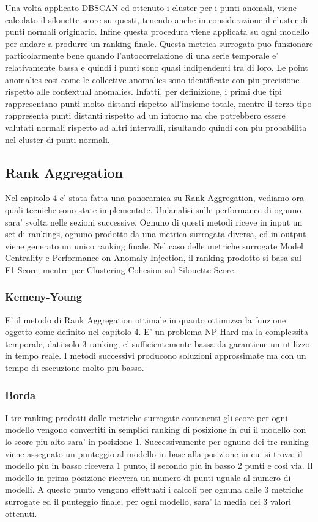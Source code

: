 Una volta applicato DBSCAN ed ottenuto i cluster per i punti anomali, viene calcolato il silouette score su questi, tenendo anche in considerazione il cluster di punti normali originario.
Infine questa procedura viene applicata su ogni modello per andare a produrre un ranking finale.
Questa metrica surrogata puo funzionare particolarmente bene quando l'autocorrelazione di una serie temporale e' relativamente bassa e quindi i punti sono quasi indipendenti tra di loro. Le point anomalies cosi come le collective anomalies sono identificate con piu precisione rispetto alle contextual anomalies. Infatti, per definizione, i primi due tipi rappresentano punti molto distanti rispetto all'insieme totale, mentre il terzo tipo rappresenta punti distanti rispetto ad un intorno ma che potrebbero essere valutati normali rispetto ad altri intervalli, risultando quindi con piu probabilita nel cluster di punti normali.
\subsection{Rank Aggregation}
Nel capitolo 4 e' stata fatta una panoramica su Rank Aggregation, vediamo ora quali tecniche sono state implementate. Un'analisi sulle performance di ognuno sara' svolta nelle sezioni successive.
Ognuno di questi metodi riceve in input un set di rankings, ognuno prodotto da una metrica surrogata diversa, ed in output viene generato un unico ranking finale.
Nel caso delle metriche surrogate Model Centrality e Performance on Anomaly Injection, il ranking prodotto si basa sul F1 Score; mentre per Clustering Cohesion sul Silouette Score.
\subsubsection{Kemeny-Young}
E' il metodo di Rank Aggregation ottimale in quanto ottimizza la funzione oggetto come definito nel capitolo 4. E' un problema NP-Hard ma la complessita temporale, dati solo 3 ranking, e' sufficientemente bassa da garantirne un utilizzo in tempo reale. I metodi successivi producono soluzioni approssimate ma con un tempo di esecuzione molto piu basso.
\subsubsection{Borda}
I tre ranking prodotti dalle metriche surrogate contenenti gli score per ogni modello vengono convertiti in semplici ranking di posizione in cui il modello con lo score piu alto sara' in posizione 1. Successivamente per ognuno dei tre ranking viene assegnato un punteggio al modello in base alla posizione in cui si trova: il modello piu in basso ricevera 1 punto, il secondo piu in basso 2 punti e cosi via. Il modello in prima posizione ricevera un numero di punti uguale al numero di modelli. A questo punto vengono effettuati i calcoli per ognuna delle 3 metriche surrogate ed il punteggio finale, per ogni modello, sara' la media dei 3 valori ottenuti.
